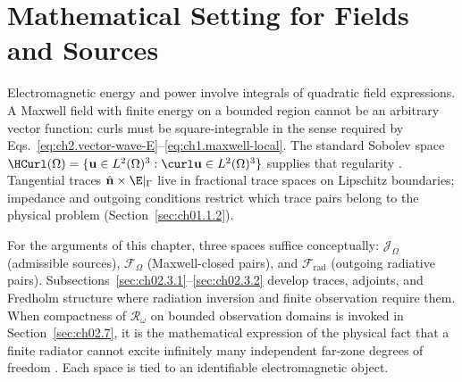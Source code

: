 \section{Mathematical Setting for Fields and Sources}
\label{sec:ch02.3}

Electromagnetic energy and power involve integrals of quadratic field expressions. A Maxwell field with finite energy on a bounded region cannot be an arbitrary vector function: curls must be square-integrable in the sense required by Eqs.~\eqref{eq:ch2.vector-wave-E}--\eqref{eq:ch1.maxwell-local}. The standard Sobolev space $\HCurl(\Omega)=\{\mathbf{u}\in L^2(\Omega)^3:\curl\mathbf{u}\in L^2(\Omega)^3\}$ supplies that regularity \cite{stratton1941}. Tangential traces $\hat{\mathbf{n}}\times\E|_\Gamma$ live in fractional trace spaces on Lipschitz boundaries; impedance and outgoing conditions restrict which trace pairs belong to the physical problem (Section~\ref{sec:ch01.1.2}).

For the arguments of this chapter, three spaces suffice conceptually: $\mathcal{J}_\Omega$ (admissible sources), $\mathcal{F}_\Omega$ (Maxwell-closed pairs), and $\mathcal{F}_{\mathrm{rad}}$ (outgoing radiative pairs). Subsections~\ref{sec:ch02.3.1}--\ref{sec:ch02.3.2} develop traces, adjoints, and Fredholm structure where radiation inversion and finite observation require them. When compactness of $\mathcal{R}_\omega$ on bounded observation domains is invoked in Section~\ref{sec:ch02.7}, it is the mathematical expression of the physical fact that a finite radiator cannot excite infinitely many independent far-zone degrees of freedom \cite{chu1948,harrington2001}. Each space is tied to an identifiable electromagnetic object.
